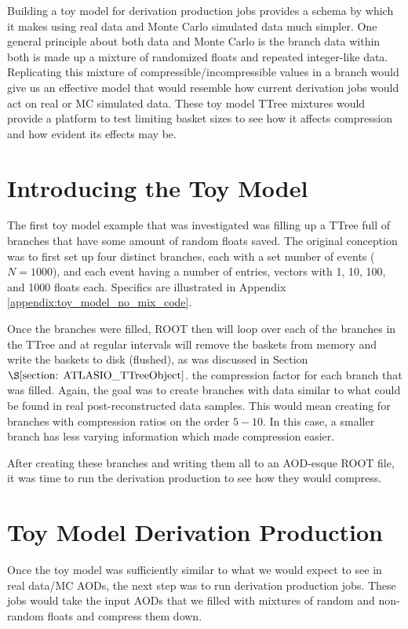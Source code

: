 Building a toy model for derivation production jobs provides a schema by which it makes using real data and Monte Carlo simulated data much simpler.
One general principle about both data and Monte Carlo is the branch data within both is made up a mixture of randomized floats and repeated integer-like data.
Replicating this mixture of compressible/incompressible values in a branch would give us an effective model that would resemble how current derivation jobs would act on real or MC simulated data. 
These toy model TTree mixtures would provide a platform to test limiting basket sizes to see how it affects compression and how evident its effects may be. 

\section{Introducing the Toy Model}

The first toy model example that was investigated was filling up a TTree full of branches that have some amount of random floats saved.
The original conception was to first set up four distinct branches, each with a set number of events ($N=1000$), and each event having a number of entries, vectors with 1, 10, 100, and 1000 floats each.
Specifics are illustrated in Appendix \ref{appendix:toy_model_no_mix_code}.

Once the branches were filled, ROOT then will loop over each of the branches in the TTree and at regular intervals will remove the baskets from memory and write the baskets to disk (flushed), as was discussed in Section $\S \ref{section: ATLASIO_TTreeObject}$.
 the compression factor for each branch that was filled.
Again, the goal was to create branches with data similar to what could be found in real post-reconstructed data samples.
This would mean creating for branches with compression ratios on the order $\mathcal{5-10}$. 
In this case, a smaller branch has less varying information which made compression easier.


After creating these branches and writing them all to an AOD-esque ROOT file, it was time to run the derivation production to see how they would compress. 

\section{Toy Model Derivation Production}

Once the toy model was sufficiently similar to what we would expect to see in real data/MC AODs, the next step was to run derivation production jobs. 
These jobs would take the input AODs that we filled with mixtures of random and non-random floats and compress them down. 

